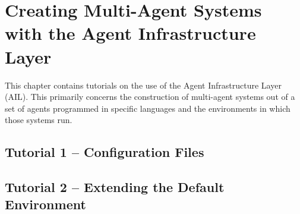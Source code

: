 %

\chapter{Creating Multi-Agent Systems with the Agent Infrastructure Layer}
\label{chap:ail}

This chapter contains tutorials on the use of the Agent Infrastructure Layer (AIL).  This primarily concerns the construction of multi-agent systems out of a set of agents programmed in specific languages and the environments in which those systems run.

\section{Tutorial 1 -- Configuration Files}

{
  \let\section\subsection
  \let\subsection\subsubsection
  \let\subsubsection\paragraph
  
  
  }

\section{Tutorial 2 -- Extending the Default Environment}

